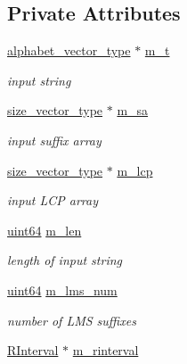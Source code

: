 \subsection*{Private Attributes}
\begin{DoxyCompactItemize}
\item 
\hyperlink{class_validate4_a49c80b3d101be19542a4341c2387603a}{alphabet\+\_\+vector\+\_\+type} $\ast$ \hyperlink{struct_validate4_1_1_l_m_s_validate_a01e3da98e0c54dad32ac5b0b083e0136}{m\+\_\+t}
\begin{DoxyCompactList}\small\item\em input string \end{DoxyCompactList}\item 
\hyperlink{class_validate4_a46ea31a0a4b23f583806792160421d15}{size\+\_\+vector\+\_\+type} $\ast$ \hyperlink{struct_validate4_1_1_l_m_s_validate_ab1f06c75524fdc58a13bdc865c107a3b}{m\+\_\+sa}
\begin{DoxyCompactList}\small\item\em input suffix array \end{DoxyCompactList}\item 
\hyperlink{class_validate4_a46ea31a0a4b23f583806792160421d15}{size\+\_\+vector\+\_\+type} $\ast$ \hyperlink{struct_validate4_1_1_l_m_s_validate_a1618db621ffc7cc9265df07c08b58b93}{m\+\_\+lcp}
\begin{DoxyCompactList}\small\item\em input L\+CP array \end{DoxyCompactList}\item 
\hyperlink{types_8h_a60e8696a4678cd348e991a1f172e53f7}{uint64} \hyperlink{struct_validate4_1_1_l_m_s_validate_a76364ef3c9b1168683dba0611b6e3114}{m\+\_\+len}
\begin{DoxyCompactList}\small\item\em length of input string \end{DoxyCompactList}\item 
\hyperlink{types_8h_a60e8696a4678cd348e991a1f172e53f7}{uint64} \hyperlink{struct_validate4_1_1_l_m_s_validate_a77706615d727c80929bca82cbfc6aa47}{m\+\_\+lms\+\_\+num}
\begin{DoxyCompactList}\small\item\em number of L\+MS suffixes \end{DoxyCompactList}\item 
\hyperlink{struct_validate4_1_1_l_m_s_validate_1_1_r_interval}{R\+Interval} $\ast$ \hyperlink{struct_validate4_1_1_l_m_s_validate_a51f4d2be526cb9a2793e793242922951}{m\+\_\+rinterval}

\end{DoxyCompactItemize}
